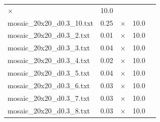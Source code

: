 \documentclass{article}
\begin{document}
\begin{center}
\begin{tabular}{lrrrr}
$\times$
 & 10.0 & 
\\
mosaic\_20x20\_d0.3\_10.txt & 0.25 & 
$\times$
 & 10.0 & 
\\
mosaic\_20x20\_d0.3\_2.txt & 0.01 & 
$\times$
 & 10.0 & 
\\
mosaic\_20x20\_d0.3\_3.txt & 0.04 & 
$\times$
 & 10.0 & 
\\
mosaic\_20x20\_d0.3\_4.txt & 0.02 & 
$\times$
 & 10.0 & 
\\
mosaic\_20x20\_d0.3\_5.txt & 0.04 & 
$\times$
 & 10.0 & 
\\
mosaic\_20x20\_d0.3\_6.txt & 0.03 & 
$\times$
 & 10.0 & 
\\
mosaic\_20x20\_d0.3\_7.txt & 0.03 & 
$\times$
 & 10.0 & 
\\
mosaic\_20x20\_d0.3\_8.txt & 0.03 & 
$\times$
 & 10.0 & 
\\
\hline\end{tabular}
\end{center}
\end{document}
